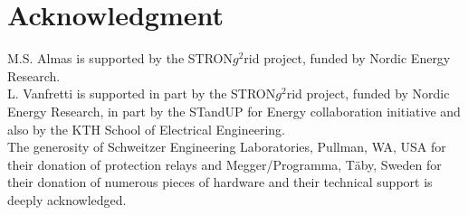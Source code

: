 \documentclass[conference]{IEEEtran}
\begin{document}


\section*{Acknowledgment}


M.S. Almas is supported by the STRON$g^{2}$rid project, funded by Nordic Energy Research.\\
L. Vanfretti is supported in part by the STRON$g^{2}$rid project, funded by Nordic Energy Research, in part by the STandUP for Energy collaboration initiative and also by the KTH School of Electrical Engineering.\\
The generosity of Schweitzer Engineering Laboratories, Pullman, WA, USA for their donation of protection relays and Megger/Programma, T\"{a}by, Sweden for their donation of numerous pieces of hardware and their technical support is deeply acknowledged.


\end{document}
